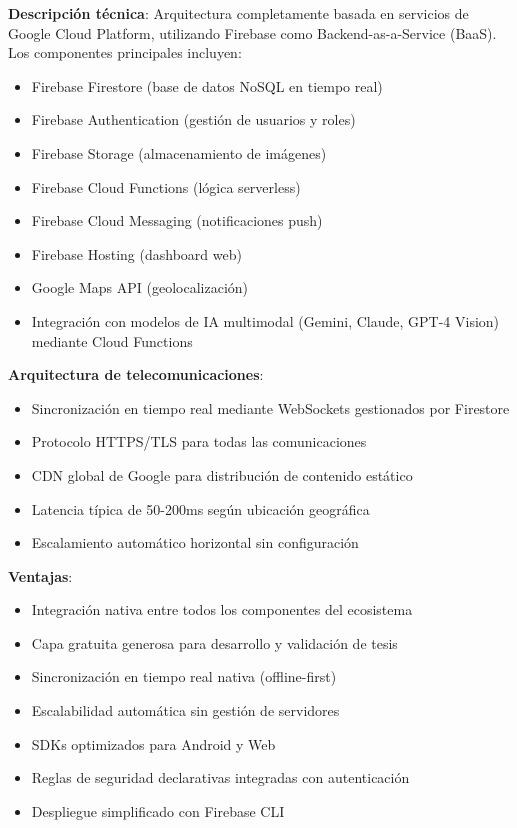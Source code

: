 \textbf{Descripción técnica}: Arquitectura completamente basada en servicios de Google Cloud Platform, utilizando Firebase como Backend-as-a-Service (BaaS). Los componentes principales incluyen:

\begin{itemize}
    \item Firebase Firestore (base de datos NoSQL en tiempo real)
    \item Firebase Authentication (gestión de usuarios y roles)
    \item Firebase Storage (almacenamiento de imágenes)
    \item Firebase Cloud Functions (lógica serverless)
    \item Firebase Cloud Messaging (notificaciones push)
    \item Firebase Hosting (dashboard web)
    \item Google Maps API (geolocalización)
    \item Integración con modelos de IA multimodal (Gemini, Claude, GPT-4 Vision) mediante Cloud Functions
\end{itemize}

\textbf{Arquitectura de telecomunicaciones}:
\begin{itemize}
    \item Sincronización en tiempo real mediante WebSockets gestionados por Firestore
    \item Protocolo HTTPS/TLS para todas las comunicaciones
    \item CDN global de Google para distribución de contenido estático
    \item Latencia típica de 50-200ms según ubicación geográfica
    \item Escalamiento automático horizontal sin configuración
\end{itemize}

\textbf{Ventajas}:
\begin{itemize}
    \item Integración nativa entre todos los componentes del ecosistema
    \item Capa gratuita generosa para desarrollo y validación de tesis
    \item Sincronización en tiempo real nativa (offline-first)
    \item Escalabilidad automática sin gestión de servidores
    \item SDKs optimizados para Android y Web
    \item Reglas de seguridad declarativas integradas con autenticación
    \item Despliegue simplificado con Firebase CLI
\end{itemize}

